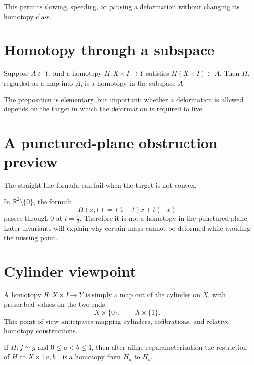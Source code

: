 This permits slowing, speeding, or pausing a deformation without changing its
homotopy class.

\section{Homotopy through a subspace}

\begin{proposition}
\label{prop:viii01-image-control}
Suppose \(A\subset Y\), and a homotopy \(H:X\times I\to Y\) satisfies
\(H(X\times I)\subset A\).  Then \(H\), regarded as a map into \(A\), is a
homotopy in the subspace \(A\).
\end{proposition}

The proposition is elementary, but important: whether a deformation is allowed
depends on the target in which the deformation is required to live.

\section{A punctured-plane obstruction preview}

The straight-line formula can fail when the target is not convex.

\begin{example}
\label{ex:viii01-punctured}
In \(\mathbb R^2\setminus\{0\}\), the formula
\[
H(x,t)=(1-t)x+t(-x)
\]
passes through \(0\) at \(t=\frac12\).  Therefore it is not a homotopy in the
punctured plane.  Later invariants will explain why certain maps cannot be
deformed while avoiding the missing point.
\end{example}

\section{Cylinder viewpoint}

A homotopy \(H:X\times I\to Y\) is simply a map out of the cylinder on \(X\),
with prescribed values on the two ends
\[
X\times\{0\},
\qquad
X\times\{1\}.
\]
This point of view anticipates mapping cylinders, cofibrations, and relative
homotopy constructions.

\begin{proposition}
\label{prop:viii01-restrict-time}
If \(H:f\simeq g\) and \(0\le a<b\le1\), then after affine reparameterization
the restriction of \(H\) to \(X\times[a,b]\) is a homotopy from \(H_a\) to
\(H_b\).
\end{proposition}

